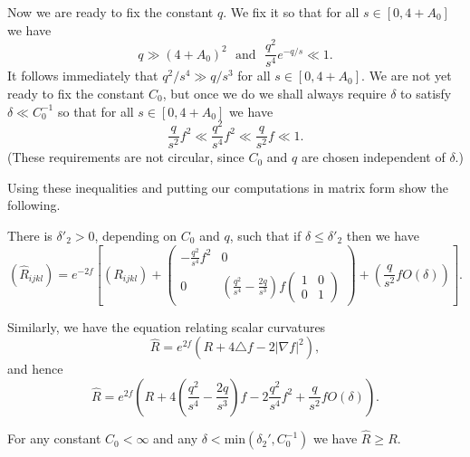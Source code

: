 Now we are ready to fix the constant $q$. We fix it so that for all $s\in
[0,4+A_0]$ we have \begin{equation}\label{qeqn}
 q \gg (4+A_0)^2\ \ \ \mathrm{and}\ \ \ \frac{q^2}{s^4}e^{-q/s} \ll 1.
 \end{equation}
It follows immediately that $q^2/s^4\gg q/s^3$ for all $s\in [0,4+A_0]$.
 We are not yet ready
to fix the constant $C_0$, but once we do we shall always require $\delta$ to
satisfy
$\delta\ll C_0^{-1}$ so that for all $s\in [0,4+A_0]$ we have
$$\frac{q}{s^2}f^2\ll \frac{q^2}{s^4}f^2\ll \frac{q}{s^2}f\ll 1.$$
(These requirements are not circular, since $C_0$ and $q$ are chosen
independent of $\delta$.)




  Using
these inequalities and putting our computations in matrix form show
the following.

\begin{corollary}
\label{cor:conformal-curvature-formula}\label{delta0}
There is $\delta'_2>0$, depending on $C_0$ and $q$,
such that if $\delta\le \delta'_2$ then we have
\begin{equation}\label{maineqn}
\left(\hat
R_{ijkl}\right)=e^{-2f}\left[\left(R_{ijkl}\right)+\begin{pmatrix}
-\frac{q^2}{s^4}f^2 & 0  \\ 0 &
\left(\frac{q^2}{s^4}-\frac{2q}{s^3}\right)f\begin{pmatrix} 1 & 0
\\ 0 & 1\end{pmatrix}
\end{pmatrix}+\left(\frac{q}{s^2}fO(\delta)\right)\right].\end{equation}
\end{corollary}

Similarly, we have the equation relating scalar curvatures
$$\hat R=e^{2f}\left(R+4\triangle f-2|\nabla f|^2\right),$$
and hence
$$\hat R=e^{2f}\left(R+4\left(\frac{q^2}{s^4}-\frac{2q}{s^3}\right)f-2\frac{q^2}{s^4}f^2+
\frac{q}{s^2}fO(\delta)\right).$$

\begin{corollary}
\label{cor:scalar-curvature-nondecreasing-conformal}
\label{Rcompar}
For any constant $C_0<\infty$ and any $\delta<\mathrm{min}(\delta_2',C_0^{-1})$ we
have $\hat R\ge R$.
\end{corollary}

